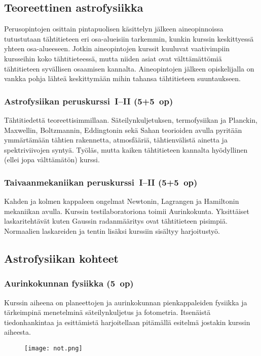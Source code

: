 \documentclass[../ala_hataile.tex]{subfiles}
\begin{document}
\subsection*{Teoreettinen astrofysiikka}
Perusopintojen osittain pintapuolisen
käsittelyn jälkeen aineopinnoissa tutustutaan
tähtitieteen eri osa-alueisiin tarkemmin, kunkin kurssin keskittyessä yhteen
osa-alueeseen. Jotkin aineopintojen kurssit
kuuluvat vaativimpiin kursseihin koko tähtitieteessä,
mutta niiden asiat ovat välttämättömiä
tähtitieteen syvällisen osaamisen
kannalta. Aineopintojen jälkeen opiskelijalla
on vankka pohja lähteä keskittymään
mihin tahansa tähtitieteen suuntaukseen.

\subsubsection*{Astrofysiikan peruskurssi~I--II (5+5~op)}
Tähtitiedettä teoreettisimmillaan. Säteilynkuljetuksen,
termofysiikan ja Planckin,
Maxwellin, Boltzmannin, Eddingtonin
sekä Sahan teorioiden avulla pyritään ymmärtämään
tähtien rakennetta, atmosfääriä,
tähtienvälistä ainetta ja spektriviivojen
syntyä. Työläs, mutta kaiken tähtitieteen
kannalta hyödyllinen (ellei jopa välttämätön)
kurssi.

\subsubsection*{Taivaanmekaniikan peruskurssi~I--II (5+5~op)}
Kahden ja kolmen kappaleen ongelmat
Newtonin, Lagrangen ja Hamiltonin mekaniikan
avulla. Kurssin testilaboratoriona
toimii Aurinkokunta. Yksittäiset laskaritehtävät
kuten Gaussin radanmääritys ovat
tähtitieteen pisimpiä. Normaalien laskareiden ja tentin lisäksi kurssiin sisältyy harjoitustyö.
\subsection*{Astrofysiikan kohteet}
\subsubsection*{Aurinkokunnan fysiikka (5~op)}
Kurssin aiheena on planeettojen ja aurinkokunnan
pienkappaleiden fysiikka ja
tärkeimpinä menetelminä säteilynkuljetus
ja fotometria. Itsenäistä tiedonhankintaa ja
esittämistä harjoitellaan pitämällä esitelmä
jostakin kurssin aiheesta.
\begin{figure}[b]
	\texttt{[image: not.png]}
\end{figure}
\end{document}
